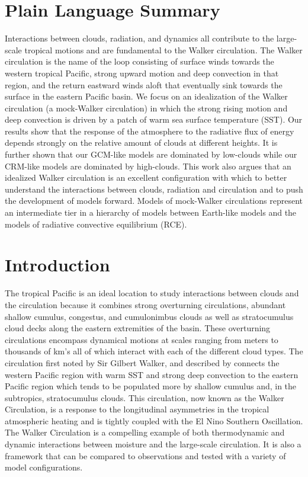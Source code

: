 \documentclass[draft]{agujournal2019}
\begin{document}
\section*{Plain Language Summary}
Interactions between clouds, radiation, and dynamics all contribute
to the large-scale tropical motions and are fundamental to the Walker circulation.  
The Walker circulation is the name of the loop consisting of surface winds towards the western tropical Pacific, 
strong upward motion and deep convection in that region,  and the return eastward winds aloft that 
eventually sink towards the surface in the eastern Pacific basin.  
We focus on an idealization of the Walker circulation (a mock-Walker circulation) 
in which the strong rising motion and deep convection is driven by a patch of warm sea surface temperature (SST).  
Our results show that the response of the atmosphere to the 
radiative flux of energy depends strongly on the relative amount of clouds at different heights.   
It is further shown that our GCM-like models are dominated by low-clouds while our CRM-like models 
are dominated by high-clouds.  This work also argues that an idealized Walker circulation is an 
excellent configuration with which to better understand the interactions between clouds, radiation and circulation 
and to push the development of models forward.   Models of mock-Walker circulations represent
an intermediate tier in a hierarchy of models between Earth-like models and the models of 
radiative convective equilibrium (RCE).  


\section{Introduction}

The tropical Pacific is an ideal location to study interactions between clouds and the circulation 
because it combines strong overturning circulations, abundant shallow cumulus, congestus, and cumulonimbus 
clouds \cite{Johnson1999} as well as stratocumulus cloud decks along the eastern extremities of the basin.
These overturning circulations encompass dynamical motions at scales
ranging from meters to thousands of km's all of which interact with each of the different cloud types.
The circulation first noted by Sir Gilbert Walker, and described by  connects the 
western Pacific region with warm SST and strong deep convection to the eastern Pacific region which tends to 
be populated more by shallow cumulus and, in the subtropics, stratocumulus clouds.  
This circulation, now known as the Walker Circulation, is a response to the 
longitudinal asymmetries in the tropical atmospheric heating and is tightly coupled with 
the El Nino Southern Oscillation.    
The Walker Circulation is a compelling example of both thermodynamic and dynamic interactions
between moisture and the large-scale circulation.  It is also a framework that can be compared 
to observations and tested with a variety of model configurations. 
\end{document}
